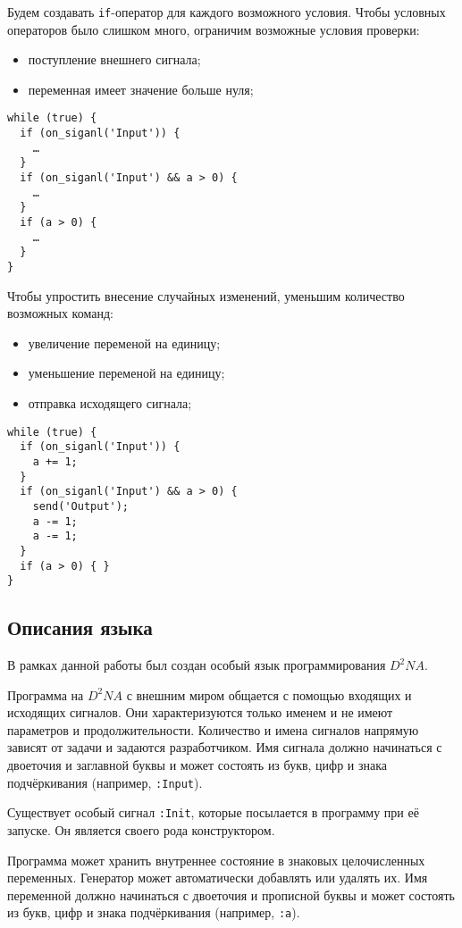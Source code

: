 \documentclass[utf8,a5paper,portrait,10pt]{eskdtext}
\begin{document}
Будем создавать \texttt{if}-оператор для каждого возможного условия. Чтобы
условных операторов было слишком много, ограничим возможные условия проверки:
\begin{itemize}
  \item поступление внешнего сигнала;
  \item переменная имеет значение больше нуля;
\end{itemize}

\newpage
\begin{verbatim}
while (true) {
  if (on_siganl('Input')) {
    …
  }
  if (on_siganl('Input') && a > 0) {
    …
  }
  if (a > 0) {
    …
  }
}
\end{verbatim}

Чтобы упростить внесение случайных изменений, уменьшим количество возможных
команд:
\begin{itemize}
  \item увеличение переменой на единицу;
  \item уменьшение переменой на единицу;
  \item отправка исходящего сигнала;
\end{itemize}

\begin{verbatim}
while (true) {
  if (on_siganl('Input')) {
    a += 1;
  }
  if (on_siganl('Input') && a > 0) {
    send('Output');
    a -= 1;
    a -= 1;
  }
  if (a > 0) { }
}
\end{verbatim}

\subsection{Описания языка}

В рамках данной работы был создан особый язык программирования $D^2NA$.

Программа на $D^2NA$ с внешним миром общается с помощью входящих и исходящих
сигналов. Они характеризуются только именем и не имеют параметров и
продолжительности. Количество и имена сигналов напрямую зависят от задачи и
задаются разработчиком. Имя сигнала должно начинаться с двоеточия и заглавной
буквы и может состоять из букв, цифр и знака подчёркивания (например,
\texttt{:Input}).

Существует особый сигнал \texttt{:Init}, которые посылается в программу при её
запуске. Он является своего рода конструктором.

Программа может хранить внутреннее состояние в знаковых целочисленных
переменных. Генератор может автоматически добавлять или удалять их. Имя
переменной должно начинаться с двоеточия и прописной буквы и может состоять из
букв, цифр и знака подчёркивания (например, \texttt{:a}).
\end{document}
